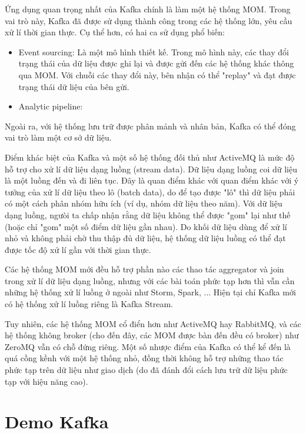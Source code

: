\documentclass{article}
\begin{document}
Ứng dụng quan trọng nhất của Kafka chính là làm một hệ thống MOM. Trong vai trò
này, Kafka đã được sử dụng thành công trong các hệ thống lớn, yêu cầu xử lí thời
gian thực. Cụ thể hơn, có hai ca sử dụng phổ biến:

\begin{itemize}
    \item Event sourcing: Là một mô hình thiết kế. Trong mô hình này, các thay
        đổi trạng thái của dữ liệu được ghi lại và được gửi đến các hệ thống
        khác thông qua MOM. Với chuỗi các thay đổi này, bên nhận có thể "replay"
        và đạt được trạng thái dữ liệu của bên gửi.
    \item Analytic pipeline:
\end{itemize}

Ngoài ra, với hệ thống lưu trữ được phân mảnh và nhân bản, Kafka có thể đóng vai
trò làm một cơ sở dữ liệu.

Điểm khác biệt của Kafka và một số hệ thống đối thủ như ActiveMQ là mức độ hỗ
trợ cho xử lí dữ liệu dạng luồng (stream data). Dữ liệu dạng luồng coi dữ liệu
là một luồng đến và đi liên tục. Đây là quan điểm khác với quan điểm khác với ý
tưởng của xử lí dữ liệu theo lô (batch data), do để tạo được "lô" thì dữ liệu
phải có một cách phân nhóm hữu ích (ví dụ, nhóm dữ liệu theo năm). Với dữ liệu
dạng luồng, ngưòi ta chấp nhận rằng dữ liệu không thể được "gom" lại như thế
(hoặc chỉ "gom" một số điểm dữ liệu gần nhau). Do khối dữ liệu dùng để xử lí nhỏ
và không phải chờ thu thập đủ dữ liệu, hệ thống dữ liệu luồng có thể đạt được
tốc độ xử lí gần với thời gian thực.

Các hệ thống MOM mới đều hỗ trợ phần nào các thao tác aggregator và join trong
xử lí dữ liệu dạng luồng, nhưng với các bài toán phức tạp hơn thì vẫn cần những
hệ thống xử lí luồng ở ngoài như Storm, Spark, ... Hiện tại chỉ Kafka mới có hệ
thống xử lí luồng riêng là Kafka Stream.

Tuy nhiên, các hệ thống MOM cổ điển hơn như ActiveMQ hay RabbitMQ, và các hệ
thống không broker (cho đến đây, các MOM được bàn đến đều có broker) như ZeroMQ
vẫn có chỗ đứng riêng. Một số nhược điểm của Kafka có thể kể đến là quá cồng
kềnh với một hệ thống nhỏ, đồng thời không hỗ trợ những thao tác phức tạp trên
dữ liệu như giao dịch (do đã đánh đổi cách lưu trữ dữ liệu phức tạp với hiệu
năng cao).

\section{Demo Kafka}
\end{document}
